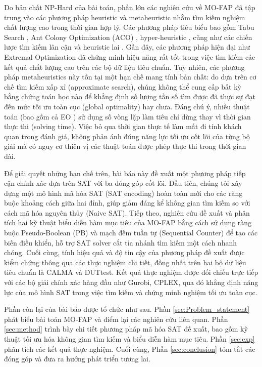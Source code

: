 \documentclass[letterpaper,journal]{IEEEtran}
\begin{document}
Do bản chất NP-Hard của bài toán, phần lớn các nghiên cứu về MO-FAP đã tập trung vào các phương pháp heuristic và metaheuristic nhằm tìm kiếm nghiệm chất lượng cao trong thời gian hợp lý. 
Các phương pháp tiêu biểu bao gồm Tabu Search \cite{Dib2009,Alrajhi2016_Dynamic,Alrajhi2016_Hybridized}, Ant Colony Optimization (ACO) \cite{Alrajhi2023DynamicACO}, hyper-heuristic \cite{Mahmoudi2023}, cũng như các chiến lược tìm kiếm lân cận và heuristic lai \cite{Alrajhi2023Neighborhood}. 
Gần đây, các phương pháp hiện đại như Extremal Optimization \cite{Gomez2023MO} đã chứng minh hiệu năng rất tốt trong việc tìm kiếm các kết quả chất lượng cao trên các bộ dữ liệu tiêu chuẩn. Tuy nhiên, các phương pháp metaheuristics này tồn tại một hạn chế mang tính bản chất: do dựa trên cơ chế tìm kiếm xấp xỉ (approximate search), chúng không thể cung cấp bất kỳ bằng chứng toán học nào để khẳng định số lượng tần số tìm được đã thực sự đạt đến mức tối ưu toàn cục (global optimality) hay chưa. Đáng chú ý, nhiều thuật toán (bao gồm cả EO \cite{Gomez2023MO}) sử dụng số vòng lặp làm tiêu chí dừng thay vì thời gian thực thi (solving time). Việc bỏ qua thời gian thực tế làm mất đi tính khách quan trong đánh giá, không phản ánh đúng năng lực tối ưu cốt lõi của từng bộ giải mà có nguy cơ thiên vị các thuật toán được phép thực thi trong thời gian dài.

Để giải quyết những hạn chế trên, bài báo này đề xuất một phương pháp tiếp cận chính xác dựa trên SAT với ba đóng góp cốt lõi. Đầu tiên, chúng tôi xây dựng một mô hình mã hóa SAT (SAT encoding) hoàn toàn mới cho các ràng buộc khoảng cách giữa hai đỉnh, giúp giảm đáng kể không gian tìm kiếm so với cách mã hóa nguyên thủy (Naive SAT). Tiếp theo, nghiên cứu đề xuất và phân tích hai kỹ thuật biểu diễn hàm mục tiêu của MO-FAP bằng cách sử dụng ràng buộc Pseudo-Boolean (PB) và mạch đếm tuần tự (Sequential Counter) để tạo các biến điều khiển, hỗ trợ SAT solver cắt tỉa nhánh tìm kiếm một cách nhanh chóng. Cuối cùng, tính hiệu quả và độ tin cậy của phương pháp đề xuất được kiểm chứng thông qua các thực nghiệm chi tiết, đồng nhất trên hai bộ dữ liệu tiêu chuẩn là CALMA và DUTtest. Kết quả thực nghiệm được đối chiếu trực tiếp với các bộ giải chính xác hàng đầu như Gurobi, CPLEX, qua đó khẳng định năng lực của mô hình SAT trong việc tìm kiếm và chứng minh nghiệm tối ưu toàn cục.

Phần còn lại của bài báo được tổ chức như sau. Phần \ref{sec:Problem_statement} phát biểu bài toán MO-FAP và điểm lại các nghiên cứu liên quan. Phần \ref{sec:method} trình bày chi tiết phương pháp mã hóa SAT đề xuất, bao gồm kỹ thuật tối ưu hóa không gian tìm kiếm và biểu diễn hàm mục tiêu. Phần \ref{sec:exp} phân tích các kết quả thực nghiệm. Cuối cùng, Phần \ref{sec:conclusion} tóm tắt các đóng góp và đưa ra hướng phát triển tương lai.
\end{document}
